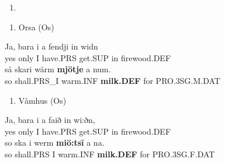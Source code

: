 \begin{enumerate} %
\item 
\end{enumerate} %
\setcounter{listLFOxcviiileveli}{0}
\begin{enumerate} %
\item 
Orsa (Os)

\end{enumerate} %
\ea\label{}
\gll Ja,  bara  i  a  fendji  in  widn\\


yes  only  I  have.PRS  get.SUP  in  firewood.DEF\\ %


\ea\label{}
\gll så  skari  wärm  \textbf{mjötje} a  num.\\


so  shall.PRS\_I  warm.INF  \textbf{milk.DEF} for  PRO.3SG.M.DAT\\ %


\begin{enumerate} %
\item 
Våmhus (Os)

\end{enumerate} %
\ea\label{}
\gll Ja,  bara  i  a  faið  in  wi:ðn,  \\


yes  only  I  have.PRS  get.SUP  in  firewood.DEF  \\ %


\ea\label{}
\gll so  ska  i  werm  \textbf{miö:ts\={i}} a  na.\\


so  shall.PRS  I  warm.INF  \textbf{milk.DEF} for  PRO.3SG.F.DAT\\ %


